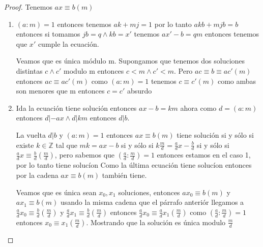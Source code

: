 \documentclass{article}
\theoremstyle{break}
\def \Z{\mathbb{Z}}
\begin{document}
        \begin{proof}
            Tenemos $ax\equiv b(m)$
            \begin{enumerate}
                \item $(a:m)=1$ entonces tenemos $ak +mj = 1$ por lo tanto $akb + mjb = b$ entonces
                si tomamos $jb=q \land kb = x'$ tenemos $ax' - b = qm$ entonces tenemos que $x'$ cumple
                la ecuación.

                Veamos que es única módulo m. Supongamos que tenemos dos soluciones distintas $c \land c'$ 
                modulo m entonces $c<m \land c'<m$. Pero $ac \equiv b \equiv ac' (m)$ entonces $ac\equiv ac' (m)$
                como $(a:m)=1$ tenemos $c\equiv c'(m)$ como ambas son menores que m entonces $c=c'$ absurdo

                \item Ida la ecuación tiene solución entonces $ax -b = km$ ahora como $d=(a:m)$ entonces 
                $d|-ax \land d|km$ entonces $d|b$. 

                La vuelta $d|b$ y $(a:m) = 1$ entonces $ax\equiv b(m) $ tiene solución si y sólo si
                existe $k\in\Z$ tal que $mk=ax-b$ si y sólo si $k\frac{m}{d} = \frac{a}{d}x - \frac{b}{d}$
                si y sólo si $\frac{a}{d}x \equiv \frac{b}{d} (\frac{m}{d})$, pero sabemos que 
                $(\frac{a}{d} :\frac{m}{d}) = 1$ entonces estamos en el caso 1, por lo tanto tiene solucíon
                Como la última ecuación tiene solucíon entonces por la cadena $ax\equiv b (m)$ también tiene.

                Veamos que es única sean $x_0,x_1$ soluciones, entonces $ax_0\equiv b(m)$ y $ax_1\equiv b(m)$
                usando la misma cadena que el párrafo anteriór llegamos a 
                $\frac{a}{d}x_0 \equiv \frac{b}{d} (\frac{m}{d})$ y 
                $\frac{a}{d}x_1 \equiv \frac{b}{d} (\frac{m}{d})$ 
                entonces $\frac{a}{d}x_0 \equiv \frac{a}{d}x_1 (\frac{m}{d})$ como 
                $(\frac{a}{d}:\frac{m}{d})=1$ entonces $x_0\equiv x_1 (\frac{m}{d})$. Mostrando que la solución
                es única modulo $\frac{m}{d}$
            \end{enumerate}
        \end{proof}
\end{document}
